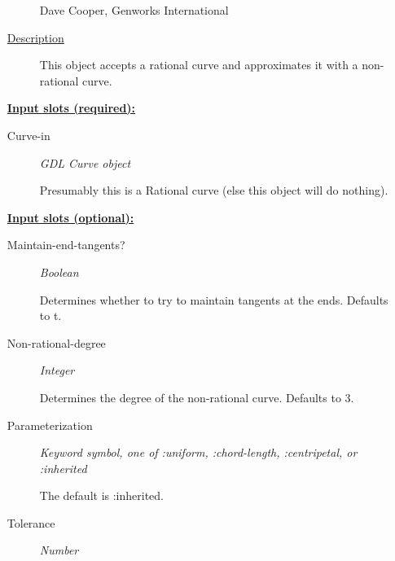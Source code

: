\documentclass [11pt]{book}
\begin{document}
\begin{itemize}
\begin{description}
Dave Cooper, Genworks International



\item [
\underline{Description}]


This object accepts a rational curve and approximates it with a non-rational curve.



\end{description}








\textbf{
\underline{Input slots (required):}}

\begin{description}

\item [Curve-in]
\emph{GDL Curve object}

 Presumably this is a Rational curve (else this object will do nothing).




\end{description}






\textbf{
\underline{Input slots (optional):}}

\begin{description}

\item [Maintain-end-tangents?]
\emph{Boolean}

 Determines whether to try to maintain tangents at the ends. Defaults to t.




\item [Non-rational-degree]
\emph{Integer}

 Determines the degree of the non-rational curve. Defaults to 3.




\item [Parameterization]
\emph{Keyword symbol, one of :uniform, :chord-length, :centripetal, or :inherited}

 The default is :inherited.




\item [Tolerance]
\emph{Number}


\end{description}
\end{itemize}
\end{document}
